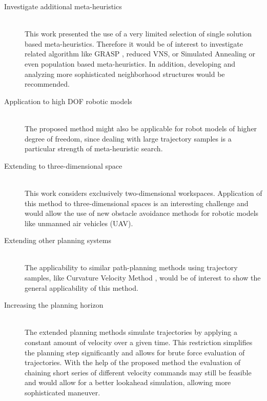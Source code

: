 \begin{description}
\item[Investigate additional meta-heuristics]\hfill \\
This work presented the use of a very limited selection of single solution based meta-heuristics. Therefore it would be of interest to investigate related algorithm like GRASP \cite{feo1995grasp}, reduced VNS, or Simulated Annealing \cite{Kirkpatrick83SimulatedAnnealing} or even population based meta-heuristics.
In addition, developing and analyzing more sophisticated neighborhood structures would be recommended. 

\item[Application to high DOF robotic models]\hfill \\
The proposed method might also be applicable for robot models of higher degree of freedom, since dealing with large trajectory samples is a particular strength of meta-heuristic search.

\item[Extending to three-dimensional space]\hfill \\
This work considers exclusively two-dimensional workspaces. Application of this method to three-dimensional spaces is an interesting challenge and would allow the use of new obstacle avoidance methods for robotic models like unmanned air vehicles (UAV).

\item[Extending other planning systems]\hfill \\
The applicability to similar path-planning methods using trajectory samples, like Curvature Velocity Method \cite{simmons1996curvature}, would be of interest to show the general applicability of this method. 


\item[Increasing the planning horizon]\hfill \\
The extended planning methods simulate trajectories by applying a constant amount of velocity over a given time. This restriction simplifies the planning step significantly and allows for brute force evaluation of trajectories. With the help of the proposed method the evaluation of chaining short series of different velocity commands may still be feasible and would allow for a better lookahead simulation, allowing more sophisticated maneuver.

\end{description}
